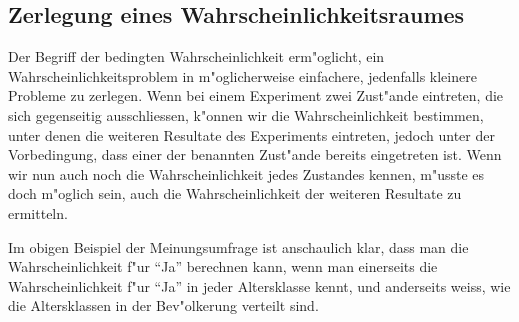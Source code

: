 \subsection{Zerlegung eines Wahrscheinlichkeitsraumes}
Der
Begriff der bedingten Wahrscheinlichkeit erm"oglicht,
ein Wahrscheinlichkeitsproblem in m"oglicherweise einfachere, jedenfalls
kleinere Probleme zu zerlegen. Wenn bei einem Experiment zwei Zust"ande
eintreten, die sich gegenseitig ausschliessen, k"onnen wir die 
Wahrscheinlichkeit bestimmen, unter denen die weiteren Resultate
des Experiments eintreten, jedoch unter der Vorbedingung, dass einer
der benannten Zust"ande bereits eingetreten ist. Wenn wir nun auch
noch die Wahrscheinlichkeit jedes Zustandes kennen, m"usste es doch
m"oglich sein, auch die Wahrscheinlichkeit der weiteren Resultate zu
ermitteln.

Im obigen Beispiel der Meinungsumfrage ist anschaulich klar, dass man die
Wahrscheinlichkeit f"ur ``Ja'' berechnen kann, wenn man einerseits die
Wahrscheinlichkeit f"ur ``Ja'' in  jeder Altersklasse kennt, und anderseits
weiss, wie die Altersklassen in der Bev"olkerung verteilt sind.

